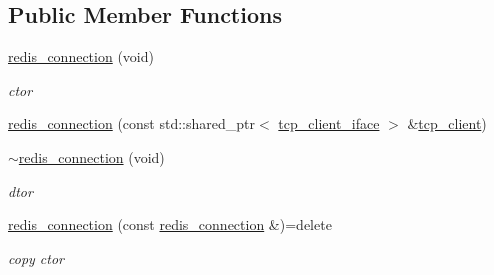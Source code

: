 \subsection*{Public Member Functions}
\begin{DoxyCompactItemize}
\item 
\mbox{\label{classcpp__redis_1_1network_1_1redis__connection_aee0302e4ff9c9b5b2e7f467d869d45f7}} 
\hyperlink{classcpp__redis_1_1network_1_1redis__connection_aee0302e4ff9c9b5b2e7f467d869d45f7}{redis\+\_\+connection} (void)
\begin{DoxyCompactList}\small\item\em ctor \end{DoxyCompactList}\item 
\hyperlink{classcpp__redis_1_1network_1_1redis__connection_a6880cfb2e1b037fcdaa5f0a6d515b375}{redis\+\_\+connection} (const std\+::shared\+\_\+ptr$<$ \hyperlink{classcpp__redis_1_1network_1_1tcp__client__iface}{tcp\+\_\+client\+\_\+iface} $>$ \&\hyperlink{classcpp__redis_1_1network_1_1tcp__client}{tcp\+\_\+client})
\item 
\mbox{\label{classcpp__redis_1_1network_1_1redis__connection_a9d392191ce262eddd5570b57e07aa051}} 
\hyperlink{classcpp__redis_1_1network_1_1redis__connection_a9d392191ce262eddd5570b57e07aa051}{$\sim$redis\+\_\+connection} (void)
\begin{DoxyCompactList}\small\item\em dtor \end{DoxyCompactList}\item 
\mbox{\label{classcpp__redis_1_1network_1_1redis__connection_a2bdd38bbfd5d97aeca8e433465c4d621}} 
\hyperlink{classcpp__redis_1_1network_1_1redis__connection_a2bdd38bbfd5d97aeca8e433465c4d621}{redis\+\_\+connection} (const \hyperlink{classcpp__redis_1_1network_1_1redis__connection}{redis\+\_\+connection} \&)=delete
\begin{DoxyCompactList}\small\item\em copy ctor \end{DoxyCompactList}\item 
\mbox{\label{classcpp__redis_1_1network_1_1redis__connection_a54a4c28ad1b9e9f3bac2854fddf4e30d}} 

\end{DoxyCompactItemize}
